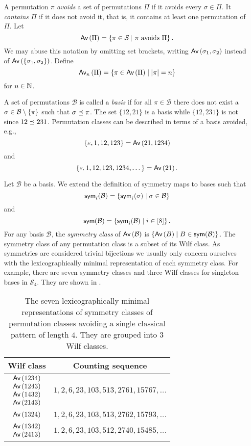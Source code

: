 A permutation $\pi$ \emph{avoids} a set of permutations $\Pi$ if it avoids every $\sigma \in \Pi$. It \emph{contains} $\Pi$ if it does not avoid it, that is, it contains at least one permutation of $\Pi$. Let 
\[
    \Av{\Pi} = \cset{\pi \in \mathcal{S}}{\pi \text{ avoids } \Pi}.
\]
We may abuse this notation by omitting set brackets, writing $\Av{\sigma_1,\sigma_2}$ instead of $\Av{\set{\sigma_1,\sigma_2}}$. Define \[
    \Avn{n}{\Pi} = \cset{\pi \in \Av{\Pi}}{|\pi| = n}
\]
for $n\in\N$.

A set of permutations $\mathcal{B}$ is called a \emph{basis} if for all $\pi\in\mathcal{B}$ there does not exist a $\sigma \in \mathcal{B} \setminus \set{\pi}$ such that $\contains{\pi}{\sigma}$. The set $\{12,21\}$ is a basis while $\{12,231\}$ is not since $\contains{231}{12}$. Permutation classes can be described in terms of a basis avoided, e.g., 
\[
    \{\varepsilon,1,12,123\} = \Av{21, 1234}
\]
and
\[
    \{\varepsilon, 1, 12, 123, 1234,\dotsc\} = \Av{21}.
\]

Let $\mathcal{B}$ be a basis. We extend the definition of symmetry maps to bases such that
\[
    \sym_i(\mathcal{B}) = \cset{\sym_i(\sigma)}{\sigma \in \mathcal{B}}
\]
and
\[
    \sym(\mathcal{B}) = \cset{\sym_i(\mathcal{B})}{i \in [8]}.
\]
For any basis $\mathcal{B}$, the \emph{symmetry class} of $\Av{\mathcal{B}}$ is $\cset{\Av{B}}{B \in \sym(\mathcal{B})}$. The symmetry class of any permutation class is a subset of its Wilf class. As symmetries are considered trivial bijections we usually only concern ourselves with the lexicographically minimal representation of each symmetry class. For example, there are seven symmetry classes and three Wilf classes for singleton bases in $\mathcal{S}_4$. They are shown in .

\begin{table}[ht!]
    \centering
    \begin{tabular}{c|c}
        Wilf class & Counting sequence\\
        \hline
        $\begin{matrix}\Av{1234}\\\Av{1243}\\\Av{1432}\\\Av{2143}\end{matrix}$ & $1, 2, 6, 23, 103, 513, 2761, 15767, \dotsc$ \\
        \hline
        $\begin{matrix}\Av{1324}\end{matrix}$ & $1, 2, 6, 23, 103, 513, 2762, 15793,\dotsc$\\
        \hline
        $\begin{matrix}\Av{1342}\\\Av{2413}\end{matrix}$ & $1, 2, 6, 23, 103, 512, 2740, 15485,\dotsc$
    \end{tabular}
    \caption{The seven lexicographically minimal representations of symmetry classes of permutation classes avoiding a single classical pattern of length $4$. They are grouped into $3$ Wilf classes.}
    \label{tab:wilfcls4}
\end{table}




